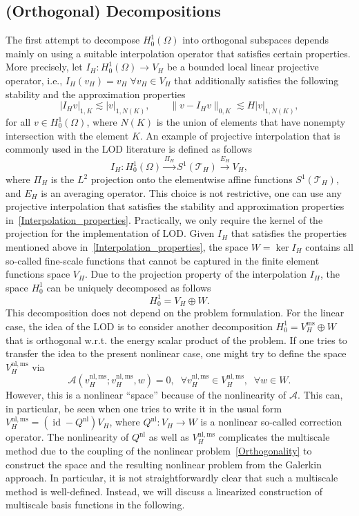 \documentclass{article}
\begin{document}
\subsection{(Orthogonal) Decompositions}
The first attempt to decompose $H_0^1(\Omega)$ into orthogonal subspaces depends mainly on using a suitable interpolation operator that satisfies certain properties. More precisely, let $I_H: H^1_0(\Omega)\xrightarrow{}V_H$ be a bounded local linear projective operator, i.e., $I_H(v_H)=v_H \; \forall v_H \in V_H$ that additionally satisfies the following stability and the approximation properties 
\begin{equation}\label{Interpolation_properties}
    |I_Hv|_{1,K}   \lesssim |v|_{1,N(K)}, \qquad
    \|v-I_Hv\|_{0,K}  \lesssim H|v|_{1,N(K)}, 
\end{equation}
 for all $v \in  H_0^1(\Omega)$, where $N(K)$ is the union of elements that have  nonempty intersection with the element $K$. 
 An example of projective interpolation that is commonly used in the LOD literature is defined as follows 
\[I_H: H_0^1(\Omega)\xrightarrow{\Pi_H}S^1(\mathcal{T}_H)\xrightarrow{E_H}V_H,\]
where $\Pi_H$ is the $L^2$ projection onto the elementwise affine functions $S^1( \mathcal{T}_H )$, and $E_H$ is an averaging operator. This choice is not restrictive, one can use any projective interpolation that satisfies the stability and approximation properties in~\eqref{Interpolation_properties}. Practically, we only require the kernel of the projection for the implementation of LOD. Given $I_H$ that satisfies the properties mentioned above in~\eqref{Interpolation_properties}, the space $W=\operatorname{ker}I_H$ contains all so-called fine-scale functions that cannot be captured in the finite element functions space $V_H$. Due to the projection property of the interpolation $I_H$, the space $H_0^1$ can be uniquely decomposed as follows \[H_0^1=V_H\oplus  W.\] 
This decomposition does not depend on the problem formulation. For the linear case, the idea of the LOD is to consider another decomposition $H_0^1=V_H^\mathrm{ms}\oplus  W$ that is orthogonal w.r.t. the energy scalar product of the problem.
If one tries to transfer the idea to the present nonlinear case, one might try to define the space $V_H^\mathrm{nl,ms}$ via
    \begin{equation}\label{Orthogonality}
        \mathcal{A}(v_H^\mathrm{nl,ms};v_H^\mathrm{nl,ms},w)=0 , \; \;  \forall v_H^\mathrm{nl,ms} \in V_H^\mathrm{nl,ms},  \;   \; \forall w \in W.  
    \end{equation}
However, this is a nonlinear ``space'' because of the nonlinearity of $\mathcal A$. This can, in particular, be seen when one tries to write it in the usual form $V_H^\mathrm{nl,ms} =(\operatorname{id}-Q^\mathrm{nl})V_H$, where $Q^\mathrm{nl}: V_H \xrightarrow{}W$ is a nonlinear so-called correction operator. The nonlinearity of $Q^\mathrm{nl}$ as well as $V_H^\mathrm{nl,ms}$ complicates the multiscale method due to the coupling of the nonlinear problem~\eqref{Orthogonality} to construct the space and the resulting nonlinear problem from the Galerkin approach. In particular, it is not straightforwardly clear that such a multiscale method is well-defined. Instead, we will discuss a linearized construction of multiscale basis functions in the following.
\end{document}
